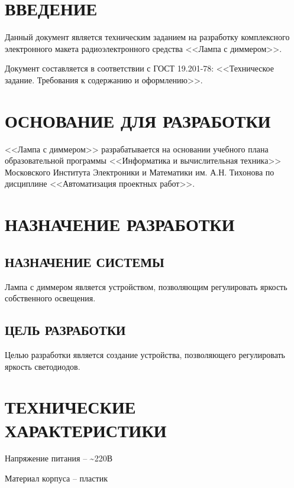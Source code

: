\documentclass[a4paper,14pt]{article}
\begin{document}

\tableofcontents
\pagebreak

\section*{ВВЕДЕНИЕ}

Данный документ является техническим заданием на разработку комплексного электронного макета радиоэлектронного средства <<Лампа с диммером>>.

Документ составляется в соответствии с ГОСТ 19.201-78: <<Техническое задание. Требования к содержанию и оформлению>>.
\newpage 

\section{ОСНОВАНИЕ ДЛЯ РАЗРАБОТКИ}

<<Лампа с диммером>> разрабатывается на основании учебного плана образовательной программы <<Информатика и вычислительная техника>> Московского Института Электроники и Математики им. А.Н. Тихонова по дисциплине <<Автоматизация проектных работ>>. 
\newpage 

\section{НАЗНАЧЕНИЕ РАЗРАБОТКИ}
\subsection{НАЗНАЧЕНИЕ СИСТЕМЫ}

Лампа с диммером является устройством, позволяющим регулировать яркость собственного освещения.	

\newpage

\subsection{ЦЕЛЬ РАЗРАБОТКИ}

Целью разработки является создание устройства, позволяющего регулировать яркость светодиодов.	

\newpage

\section{ТЕХНИЧЕСКИЕ ХАРАКТЕРИСТИКИ}

Напряжение питания -- \textasciitilde 220В

Материал корпуса -- пластик
\end{document}
